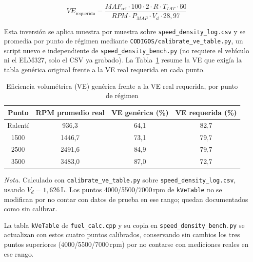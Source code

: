 \begin{equation}
	VE_{\text{requerida}} = \frac{MAF_{\text{ref}} \cdot 100 \cdot 2 \cdot R \cdot T_{IAT} \cdot 60}{RPM \cdot P_{MAP} \cdot V_d \cdot 28{,}97}
	\label{eq:ve_calibracion}
\end{equation}

Esta inversión se aplica muestra por muestra sobre \texttt{speed\_density\_log.csv} y se promedia por punto de régimen mediante \texttt{CODIGOS/calibrate\_ve\_table.py}, un script nuevo e independiente de \texttt{speed\_density\_bench.py} (no requiere el vehículo ni el ELM327, solo el CSV ya grabado). La Tabla~\ref{tab:ve_calibracion} resume la VE que exigía la tabla genérica original frente a la VE real requerida en cada punto.

\begin{table}[H]
	\centering
	\caption{Eficiencia volumétrica (VE) genérica frente a la VE real requerida, por punto de régimen}
	\label{tab:ve_calibracion}
	\begin{tabular}{cccc}
		\toprule
		\rowcolor[rgb]{0.851, 0.851, 0.851}
		\textbf{Punto} & \textbf{RPM promedio real} & \textbf{VE genérica (\%)} & \textbf{VE requerida (\%)} \\
		\midrule
		Ralentí & 936,3 & 64,1 & 82,7 \\
		1500    & 1446,7 & 73,1 & 79,7 \\
		2500    & 2491,6 & 84,9 & 79,7 \\
		3500    & 3483,0 & 87,0 & 72,7 \\
		\bottomrule
	\end{tabular}
	\vskip 0.15cm
	{\footnotesize \textit{Nota.} Calculado con \texttt{calibrate\_ve\_table.py} sobre \texttt{speed\_density\_log.csv}, usando $V_d=1{,}626$\,L. Los puntos 4000/5500/7000\,rpm de \texttt{kVeTable} no se modifican por no contar con datos de prueba en ese rango; quedan documentados como sin calibrar.}
\end{table}

La tabla \texttt{kVeTable} de \texttt{fuel\_calc.cpp} y su copia en \texttt{speed\_density\_bench.py} se actualizan con estos cuatro puntos calibrados, conservando sin cambios los tres puntos superiores (4000/5500/7000\,rpm) por no contarse con mediciones reales en ese rango.

